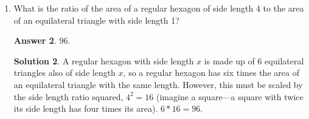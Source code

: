 \documentclass[11pt]{article}
\theoremstyle{definition}
\newtheorem*{solution}{Solution}
\newtheorem*{answer}{Answer}
\begin{document}
\begin{enumerate}
\begin{answer}
85.
\end{answer}
\begin{solution} Let the numbers be $x$ and $y$. Then, $612 = (x+y)^2 = x^2 + y^2 + 2xy$ and $272 = (x - y)^2 = x^2 + y^2 - 2xy$. Subtracting these two equations, $340 = 4xy$ and $xy = \boxed{85}$.

\end{solution}

\item What is the ratio of the area of a regular hexagon of side length 4 to the area of an equilateral triangle with side length 1? %

\begin{answer}
96.
\end{answer}
\begin{solution} A regular hexagon with side length $x$ is made up of 6 equilateral triangles also of side length $x$, so a regular hexagon has six times the area of an equilateral triangle with the same length. However, this must be scaled by the side length ratio squared, $4^2 =16$ (imagine a square—a square with twice its side length has four times its area). $6 * 16 = \boxed{96}$.
\end{solution}

\end{enumerate}
\end{document}
